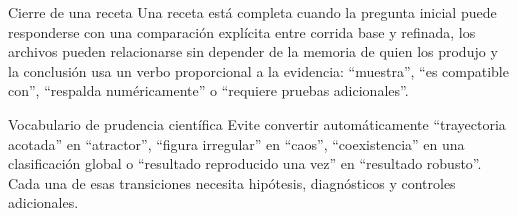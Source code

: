\begin{cajaverde}{Cierre de una receta}
Una receta está completa cuando la pregunta inicial puede responderse con una
comparación explícita entre corrida base y refinada, los archivos pueden
relacionarse sin depender de la memoria de quien los produjo y la conclusión
usa un verbo proporcional a la evidencia: ``muestra'', ``es compatible con'',
``respalda numéricamente'' o ``requiere pruebas adicionales''.
\end{cajaverde}

\begin{cajaalerta}{Vocabulario de prudencia científica}
Evite convertir automáticamente ``trayectoria acotada'' en ``atractor'',
``figura irregular'' en ``caos'', ``coexistencia'' en una clasificación global o
``resultado reproducido una vez'' en ``resultado robusto''. Cada una de esas
transiciones necesita hipótesis, diagnósticos y controles adicionales.
\end{cajaalerta}
